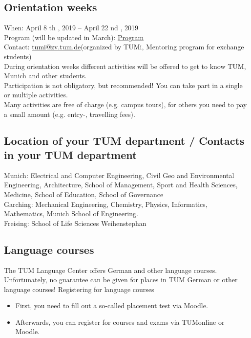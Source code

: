 \subsection{Orientation weeks}
When: April 8 th , 2019 – April 22 nd , 2019 \\
Program (will be updated in March): \href{http://www.international.tum.de/en/coming-to-tum/tumi/}{Program} \\
Contact: \href{mailto:tumi@zv.tum.de}{tumi@zv.tum.de}(organized by TUMi, Mentoring program for exchange students) \\
During orientation weeks different activities will be offered to get to know TUM, Munich and other students. \\
Participation is not obligatory, but recommended! You can take part in a single or multiple activities. \\
Many activities are free of charge (e.g. campus tours), for others you need to pay a small amount (e.g.
entry-, travelling fees).


\subsection{Location of your TUM department / Contacts in your TUM department}
Munich: Electrical and Computer Engineering, Civil Geo and Environmental Engineering, Architecture,
School of Management, Sport and Health Sciences, Medicine, School of Education, School of Governance \\
Garching: Mechanical Engineering, Chemistry, Physics, Informatics, Mathematics, Munich School of
Engineering. \\
Freising: School of Life Sciences Weihenstephan



\subsection{Language courses}
The TUM Language Center offers German and other language courses. Unfortunately, no guarantee
can be given for places in TUM German or other language courses!
Registering for language courses
\begin{itemize}
  \item First, you need to fill out a so-called placement test via Moodle.
  \item Afterwards, you can register for courses and exams via TUMonline or Moodle.
\end{itemize}


